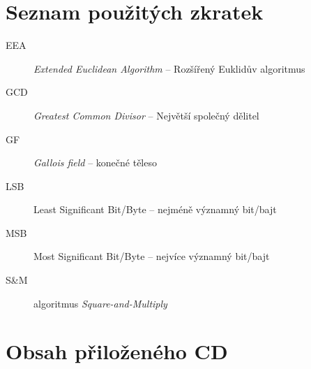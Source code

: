 \documentclass[thesis=M,czech,hidelinks]{FITthesis}[2012/06/26]
\newcommand{\0}{{\textcolor[gray]{0.80}{0}}}
\begin{document}
\appendix

\chapter{Seznam použitých zkratek}
\begin{description}
        \item[EEA] \emph{Extended Euclidean Algorithm} -- Rozšířený Euklidův algoritmus
        \item[GCD] \emph{Greatest Common Divisor} -- Největší společný dělitel
        \item[GF] \emph{Gallois field} -- konečné těleso
        \item[LSB] Least Significant Bit/Byte -- nejméně významný bit/bajt
        \item[MSB] Most Significant Bit/Byte -- nejvíce významný bit/bajt
        \item[S\&M] algoritmus \emph{Square-and-Multiply}
\end{description}


\chapter{Obsah přiloženého CD}


\begin{figure}
\end{figure}
\end{document}
